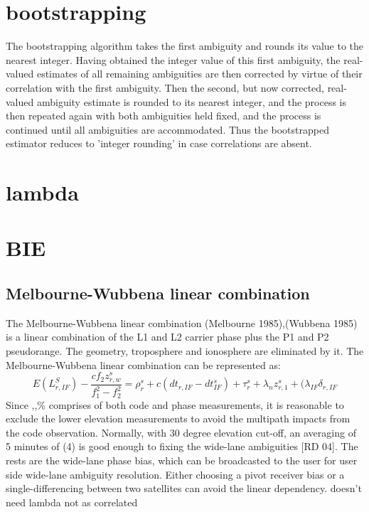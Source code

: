 \section{bootstrapping}
%
The bootstrapping algorithm takes the first ambiguity and rounds its value to the nearest integer. Having obtained the integer value of this first ambiguity, the real-valued estimates of all remaining ambiguities are then corrected by virtue of their correlation with the first ambiguity. 
Then the second, but now corrected, real-valued ambiguity estimate is rounded to its nearest integer, and the process is then repeated again with both ambiguities held fixed, and the process is continued until all ambiguities are accommodated. 
Thus the bootstrapped estimator reduces to ’integer rounding’ in case correlations are absent.
%
\section{lambda}
\section{BIE}
\subsection{Melbourne-Wubbena linear combination}
The Melbourne-Wubbena linear combination (Melbourne 1985),(Wubbena 1985) is a linear combination of the L1 and L2 carrier phase plus the P1 and P2 pseudorange. The geometry, troposphere and ionosphere are eliminated by it. The Melbourne-Wubbena linear combination can be represented as:
%
\begin{equation}
E(L_{r,IF}^S) - \frac{cf_2z_{r,w}^s}{f_1^2 - f_2^2} = \rho_r^s + c(dt_{r,IF} - dt_{IF}^s) + \tau_r^s + \lambda_n z_{r,1}^s + (\lambda_{IF}\delta_{r,IF}
\end{equation}
%
Since ,,\% comprises of both code and phase measurements, it is reasonable to exclude the lower
elevation measurements to avoid the multipath impacts from the code observation. Normally, with
30 degree elevation cut-off, an averaging of 5 minutes of (4) is good enough to fixing the wide-lane
ambiguities [RD 04]. The rests are the wide-lane phase bias, which can be broadcasted to the user for
user side wide-lane ambiguity resolution. Either choosing a pivot receiver bias or a single-differencing
between two satellites can avoid the linear dependency. 
%
%
doesn't need lambda not as correlated
%
